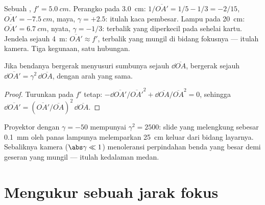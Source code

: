 \begin{example}\label{ex:b1:mirrors-thin-lenses:lensuses}
Sebuah , $f' = \qty{5.0}{cm}$. Perangko pada
\qty{3.0}{cm}: $1/\overline{OA'} = 1/5 - 1/3 = -2/15$,
$\overline{OA'} = \qty{-7.5}{cm}$, maya, $\gamma = +2.5$: itulah kaca
pembesar. Lampu pada \qty{20}{cm}: $\overline{OA'} = \qty{6.7}{cm}$,
nyata, $\gamma = -1/3$:  terbalik yang diperkecil pada sehelai
kartu. Jendela sejauh \qty{4}{m}: $\overline{OA'}
\approx f'$,  terbalik yang mungil di bidang fokusnya --- itulah
kamera. Tiga kegunaan, satu hubungan.
\end{example}

\begin{proposition}\label{prop:b1:mirrors-thin-lenses:longitudinal}
Jika bendanya bergerak menyusuri sumbunya sejauh $\dd\overline{OA}$,
 bergerak sejauh $\dd\overline{OA'} = \gamma^2\,\dd\overline{OA}$,
dengan arah yang sama.
\end{proposition}

\begin{proof}
Turunkan  pada $f'$ tetap:
$-\dd\overline{OA'}/\overline{OA'}^2 + \dd\overline{OA}/\overline{OA}^2 = 0$,
sehingga $\dd\overline{OA'} = (\overline{OA'}/\overline{OA})^2\,\dd\overline{OA}$.
\end{proof}

\begin{remark}\label{rem:b1:mirrors-thin-lenses:depth}
Proyektor dengan $\gamma = -50$ mempunyai $\gamma^2 = 2500$: slide yang
melengkung sebesar \qty{0.1}{mm} oleh panas lampunya melemparkan
 \qty{25}{cm} keluar dari bidang layarnya. Sebaliknya kamera
($\abs\gamma
\ll 1$) menoleransi perpindahan benda yang besar demi geseran 
yang mungil --- itulah kedalaman medan.
\end{remark}

\section{Mengukur sebuah jarak fokus}


